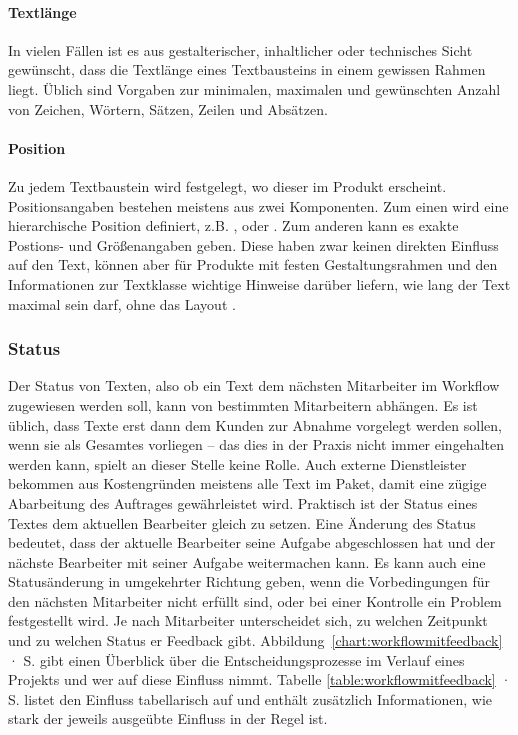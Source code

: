 \paragraph{Textlänge} In vielen Fällen ist es aus gestalterischer, inhaltlicher oder technisches Sicht gewünscht, dass die Textlänge eines Textbausteins in einem gewissen Rahmen liegt. Üblich sind Vorgaben zur minimalen, maximalen und gewünschten Anzahl von Zeichen, Wörtern, Sätzen, Zeilen und Absätzen.

\paragraph{Position} Zu jedem Textbaustein wird festgelegt, wo dieser im Produkt erscheint. Positionsangaben bestehen meistens aus zwei Komponenten. Zum einen wird eine hierarchische Position definiert, z.B. , oder . Zum anderen kann es exakte Postions- und Größenangaben geben. Diese haben zwar keinen direkten Einfluss auf den Text, können aber für Produkte mit festen Gestaltungsrahmen und den Informationen zur Textklasse wichtige Hinweise darüber liefern, wie lang der Text maximal sein darf, ohne das Layout .

\subsubsection{Status}\label{l:konzept-workflow-status}

Der Status von Texten, also ob ein Text dem nächsten Mitarbeiter im Workflow zugewiesen werden soll, kann von bestimmten Mitarbeitern abhängen. Es ist üblich, dass Texte erst dann dem Kunden zur Abnahme vorgelegt werden sollen, wenn sie als Gesamtes vorliegen -- das dies in der Praxis nicht immer eingehalten werden kann, spielt  an dieser Stelle keine Rolle. Auch externe Dienstleister bekommen aus Kostengründen meistens alle Text im Paket, damit eine zügige Abarbeitung des Auftrages gewährleistet wird. Praktisch ist der Status eines Textes dem aktuellen Bearbeiter gleich zu setzen. Eine Änderung des Status bedeutet, dass der aktuelle Bearbeiter seine Aufgabe abgeschlossen hat und der nächste Bearbeiter mit seiner Aufgabe weitermachen kann. Es kann auch eine Statusänderung in umgekehrter Richtung geben, wenn die Vorbedingungen für den nächsten Mitarbeiter nicht erfüllt sind, oder bei einer Kontrolle ein Problem festgestellt wird. Je nach Mitarbeiter unterscheidet sich, zu welchen Zeitpunkt und zu welchen Status er Feedback gibt. Abbildung~\ref{chart:workflowmitfeedback} · S.\pageref{chart:workflowmitfeedback} gibt einen Überblick über die Entscheidungsprozesse im Verlauf eines Projekts und wer auf diese Einfluss nimmt. Tabelle \ref{table:workflowmitfeedback} · S.\pageref{table:workflowmitfeedback} listet den Einfluss tabellarisch auf und enthält zusätzlich Informationen, wie stark der jeweils ausgeübte Einfluss in der Regel ist.

